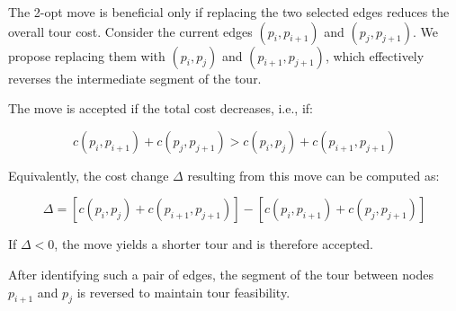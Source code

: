 The 2-opt move is beneficial only if replacing the two selected edges reduces the overall tour cost. 
Consider the current edges \((p_i, p_{i+1})\) and \((p_j, p_{j+1})\). 
We propose replacing them with \((p_i, p_j)\) and \((p_{i+1}, p_{j+1})\), 
which effectively reverses the intermediate segment of the tour.

The move is accepted if the total cost decreases, i.e., if:

\begin{equation}
    c(p_i, p_{i+1}) + c(p_j, p_{j+1}) > c(p_i, p_j) + c(p_{i+1}, p_{j+1})
    \label{eq:2opt-condition}
\end{equation}

Equivalently, the cost change \(\Delta\) resulting from this move can be computed as:

\begin{equation}
    \Delta = [c(p_i, p_j) + c(p_{i+1}, p_{j+1})] - [c(p_i, p_{i+1}) + c(p_j, p_{j+1})]
    \label{eq:2opt-delta}
\end{equation}

If \(\Delta < 0\), the move yields a shorter tour and is therefore accepted.

After identifying such a pair of edges, the segment of the tour between nodes $p_{i+1}$ and $p_j$ is reversed to maintain tour feasibility.

